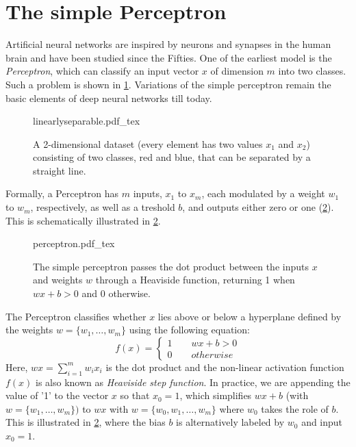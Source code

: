 \section{The simple Perceptron}
Artificial neural networks are inspired by neurons and synapses in the human brain and have been studied since the Fifties. One of the earliest model is the \textsl{Perceptron}, which can classify an input vector $x$ of dimension $m$ into two classes. Such a problem is shown in \cref{fig:linearsep}. Variations of the simple perceptron remain the basic elements of deep neural networks till today.

\begin{figure}[htb]
    \centering
    \def\svgwidth{0.6\textwidth}
    {linearlyseparable.pdf_tex}
    \caption{A 2-dimensional dataset (every element has two values $x_1$ and $x_2$) consisting of two classes, red and blue, that can be separated by a straight line.\label{fig:linearsep}}
\end{figure}

Formally, a Perceptron has $m$ inputs, $x_1$ to $x_m$, each modulated by a weight $w_1$ to $w_m$, respectively, as well as a treshold $b$, and outputs either zero or one (\cref{fig:perceptron}). This is schematically illustrated in \cref{fig:perceptron}.

\begin{figure}[htb]
    \centering
    \def\svgwidth{0.66\textwidth}
    {perceptron.pdf_tex}
    \caption{The simple perceptron passes the dot product between the inputs $x$ and weights $w$ through a Heaviside function, returning 1 when $wx+b>0$ and 0 otherwise.}\label{fig:perceptron}
\end{figure}

The Perceptron classifies whether $x$ lies above or below a hyperplane defined by the weights $w=\{w_1, \ldots, w_m\}$ using the following equation:
%
\begin{equation}
f(x)=\begin{cases}
1 \qquad wx+b > 0\\
0 \qquad otherwise
\end{cases}
\end{equation}
%
Here, $wx=\sum_{i=1}^mw_ix_i$ is the dot product and the non-linear activation function $f(x)$ is also known as \textsl{Heaviside step function}. In practice, we are appending the value of '1' to the vector $x$ so that $x_0=1$, which simplifies $wx+b$ (with $w=\{w_1, \ldots, w_m\})$ to $wx$ with $w=\{w_0, w_1, \ldots, w_m\}$ where $w_0$ takes the role of $b$. This is illustrated in \cref{fig:perceptron}, where the bias $b$ is alternatively labeled by $w_0$ and input $x_0=1$.


